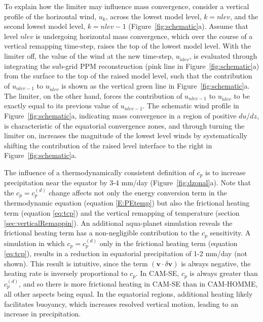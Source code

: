 \documentclass{agujournal}
\begin{document}
{To explain how the limiter may influence mass convergence, consider a vertical profile of the horizontal wind, $u_k$, across the lowest model level, $k=nlev$, and the second lowest model level, $k=nlev-1$ (Figure~\ref{fig:schematic}a). Assume that level $nlev$ is undergoing horizontal mass convergence, which over the course of a vertical remapping time-step, raises the top of the lowest model level. With the limiter off, the value of the wind at the new time-step, $u_{\tilde nlev}$, is evaluated through integrating the sub-grid PPM reconstruction (pink line in Figure~\ref{fig:schematic}a) from the surface to the top of the raised model level, such that the contribution of $u_{nlev-1}$ to $u_{\tilde nlev}$ is shown as the vertical green line in Figure~\ref{fig:schematic}a. The limiter, on the other hand, forces the contribution of $u_{nlev-1}$ to $u_{\tilde nlev}$ to be exactly equal to its previous value of $u_{nlev-1}$. The schematic wind profile in Figure~\ref{fig:schematic}a, indicating mass convergence in a region of positive $du/dz$, is characteristic of the equatorial convergence zones, and through turning the limiter on, increases the magnitude of the lowest level winds by systematically shifting the contribution of the raised level interface to the right in Figure~\ref{fig:schematic}a.

The influence of a thermodynamically consistent definition of $c_p$ is to increase precipitation near the equator by 3-4 mm/day (Figure~\ref{fig:dzonal}a). Note that the $c_p=c_p^{(d)}$ change affects not only the energy conversion term in the thermodynamic equation (equation \eqref{E:PEtemp}) but also the frictional heating term (equation \eqref{eq:tcp}) and the vertical remapping of temperature (section \ref{sec:verticalRemappin}). An additional aqua-planet simulation reveals the frictional heating term has a non-negligible contribution to the $c_p$ sensitivity. A simulation in which $c_p = c_p^{(d)}$ only in the frictional heating term (equation \eqref{eq:tcp}), results in a reduction in equatorial precipitation of 1-2 mm/day (not shown). This result is intuitive, since the term $\left(\mathbf{v}\cdot \delta \mathbf{v}\right)$ is always negative, the heating rate is inversely proportional to $c_p$. In CAM-SE, $c_p$ is always greater than $c_p^{(d)}$, and so there is more frictional heating in CAM-SE than in CAM-HOMME, all other aspects being equal. In the equatorial regions, additional heating likely facilitates buoyancy, which increases resolved vertical motion, leading to an increase in precipitation. 

}
\end{document}
